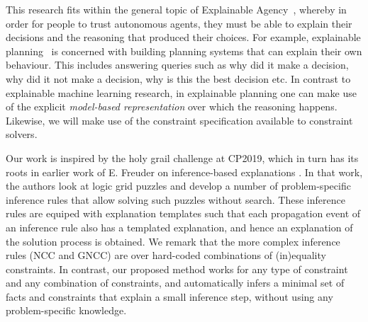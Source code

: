 This research fits within the general topic of Explainable Agency~\cite{langley2017explainable}, whereby in order for people to trust autonomous agents, they must be able to explain their decisions and the reasoning that produced their choices. For example, explainable planning~\cite{fox2017explainable} is concerned with building planning systems that can explain their own behaviour. This includes answering queries such as why did it make a decision, why did it not make a decision, why is this the best decision etc. In contrast to explainable machine learning research, in explainable planning one can make use of the explicit \textit{model-based representation} over which the reasoning happens. Likewise, we will make use of the constraint specification available to constraint solvers. %

Our work is inspired by the holy grail challenge at CP2019, which in turn has its roots in earlier work of E. Freuder on inference-based explanations \cite{sqalli1996inference}. In that work, the authors look at logic grid puzzles and develop a number of problem-specific inference rules that allow solving such puzzles without search. These inference rules are equiped with explanation templates such that each propagation event of an inference rule also has a templated explanation, and hence an explanation of the solution process is obtained. We remark that the more complex inference rules (NCC and GNCC) are over hard-coded combinations of (in)equality constraints. In contrast, our proposed method works for any type of constraint and any combination of constraints, and automatically infers a minimal set of facts and constraints that explain a small inference step, without using any problem-specific knowledge.

